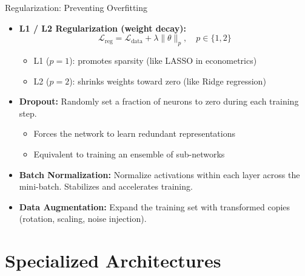 \documentclass[10pt,english,aspectratio=169]{beamer}
\begin{document}
\begin{frame}{Regularization: Preventing Overfitting}
\begin{itemize}
\item \textbf{L1 / L2 Regularization (weight decay):}
\[
\mathcal{L}_{\text{reg}} = \mathcal{L}_{\text{data}} + \lambda \|\theta\|_p, \quad p \in \{1, 2\}
\]
\begin{itemize}
\item L1 ($p=1$): promotes sparsity (like LASSO in econometrics)
\item L2 ($p=2$): shrinks weights toward zero (like Ridge regression)
\end{itemize}

\medskip
\item \textbf{Dropout:} Randomly set a fraction of neurons to zero during each training step.
\begin{itemize}
\item Forces the network to learn redundant representations
\item Equivalent to training an ensemble of sub-networks
\end{itemize}

\medskip
\item \textbf{Batch Normalization:} Normalize activations within each layer across the mini-batch. Stabilizes and accelerates training.

\medskip
\item \textbf{Data Augmentation:} Expand the training set with transformed copies (rotation, scaling, noise injection).
\end{itemize}
\end{frame}

\section{Specialized Architectures}
\end{document}
